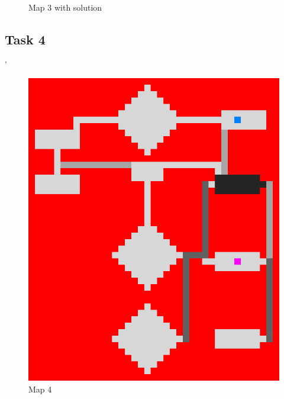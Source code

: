 \documentclass{article}
\begin{document}
\begin{figure}[h]
\begin{minipage}{0.4\textwidth}
    		\caption{Map 3 with solution}
	\end{minipage}
\end{figure}



\subsection{Task 4}
'\begin{figure}[h]
	\centering
	\begin{minipage}{0.4\textwidth}
		\includegraphics[width=\textwidth]{images/map4}
    		\caption{Map 4}
	\end{minipage}
	\hfill
	\begin{minipage}{0.4\textwidth}

\end{minipage}
\end{figure}
\end{document}
